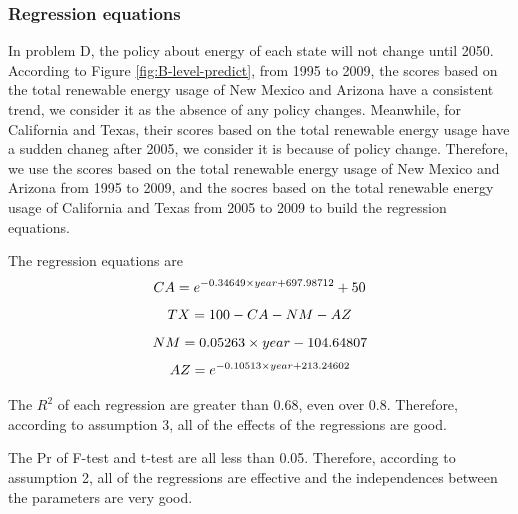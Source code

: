 \documentclass[a4paper,11pt]{article}
\begin{document}
\subsubsection{Regression equations}
\par In problem D, the policy about energy of each state will not change until 2050. According to Figure \ref{fig:B-level-predict}, from 1995 to 2009, the scores based on the total renewable energy usage of New Mexico and Arizona have a consistent trend, we consider it as the absence of any policy changes. Meanwhile, for California and Texas, their scores based on the total renewable energy usage have a sudden chaneg after 2005, we consider it is because of policy change. Therefore, we use the scores based on the total renewable energy usage of New Mexico and Arizona from 1995 to 2009, and the socres based on the total renewable energy usage of California and Texas from 2005 to 2009 to build the regression equations.
\par The regression equations are
\begin{equation}
    \centering
CA=e^{-0.34649 \times year+697.98712}+50
\end{equation}
\begin{equation}
    \centering
TX=100-CA-NM-AZ
\end{equation}
\begin{equation}
    \centering
NM=0.05263 \times year-104.64807
\end{equation}
\begin{equation}
    \centering
AZ=e^{-0.10513 \times year+213.24602}
\end{equation}
\par The $R^{2}$ of each regression are greater than 0.68, even over 0.8. Therefore, according to assumption 3, all of the effects of the regressions are good.
\par The Pr of F-test and t-test are all less than 0.05. Therefore, according to assumption 2, all of the regressions are effective and the independences between the parameters are very good.
\end{document}

